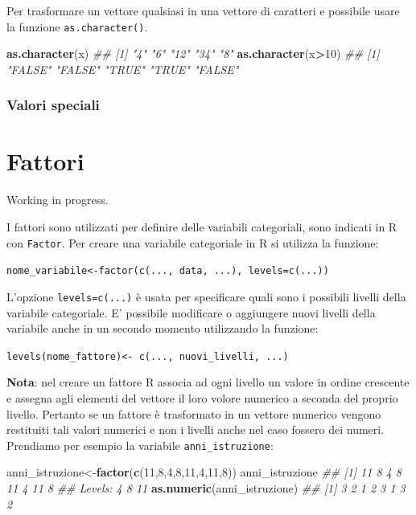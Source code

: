 \documentclass[
]{book}
\newenvironment{Shaded}{\begin{snugshade}}{\end{snugshade}}
\newcommand{\CommentTok}[1]{\textcolor[rgb]{0.56,0.35,0.01}{\textit{#1}}}
\newcommand{\DecValTok}[1]{\textcolor[rgb]{0.00,0.00,0.81}{#1}}
\newcommand{\KeywordTok}[1]{\textcolor[rgb]{0.13,0.29,0.53}{\textbf{#1}}}
\newcommand{\NormalTok}[1]{#1}
\newcommand{\OperatorTok}[1]{\textcolor[rgb]{0.81,0.36,0.00}{\textbf{#1}}}
\begin{document}
Per trasformare un vettore qualsiasi in una vettore di caratteri e possibile usare la funzione \texttt{as.character()}.

\begin{Shaded}
\begin{Highlighting}[]
\KeywordTok{as.character}\NormalTok{(x)}
\CommentTok{## [1] "4"  "6"  "12" "34" "8"}
\KeywordTok{as.character}\NormalTok{(x}\OperatorTok{>}\DecValTok{10}\NormalTok{)}
\CommentTok{## [1] "FALSE" "FALSE" "TRUE"  "TRUE"  "FALSE"}
\end{Highlighting}
\end{Shaded}

\hypertarget{valori-speciali}{%
\subsection{Valori speciali}\label{valori-speciali}}

\hypertarget{factors}{%
\chapter{Fattori}\label{factors}}

Working in progress.

I fattori sono utilizzati per definire delle variabili categoriali, sono indicati in R con \texttt{Factor}. Per creare una variabile categoriale in R si utilizza la funzione:

\texttt{nome\_variabile\textless{}-factor(c(...,\ data,\ ...),\ levels=c(...))}

L'opzione \texttt{levels=c(...)} è usata per specificare quali sono i possibili livelli della variabile categoriale. E' possibile modificare o aggiungere nuovi livelli della variabile anche in un secondo momento utilizzando la funzione:

\texttt{levels(nome\_fattore)\textless{}-\ c(...,\ nuovi\_livelli,\ ...)}

\textbf{Nota}: nel creare un fattore R associa ad ogni livello un valore in ordine crescente e assegna agli elementi del vettore il loro volore numerico a seconda del proprio livello. Pertanto se un fattore è trasformato in un vettore numerico vengono restituiti tali valori numerici e non i livelli anche nel caso fossero dei numeri. Prendiamo per esempio la variabile \texttt{anni\_istruzione}:

\begin{Shaded}
\begin{Highlighting}[]
\NormalTok{anni_istruzione<-}\KeywordTok{factor}\NormalTok{(}\KeywordTok{c}\NormalTok{(}\DecValTok{11}\NormalTok{,}\DecValTok{8}\NormalTok{,}\DecValTok{4}\NormalTok{,}\DecValTok{8}\NormalTok{,}\DecValTok{11}\NormalTok{,}\DecValTok{4}\NormalTok{,}\DecValTok{11}\NormalTok{,}\DecValTok{8}\NormalTok{))}
\NormalTok{anni_istruzione}
\CommentTok{## [1] 11 8  4  8  11 4  11 8 }
\CommentTok{## Levels: 4 8 11}
\KeywordTok{as.numeric}\NormalTok{(anni_istruzione)}
\CommentTok{## [1] 3 2 1 2 3 1 3 2}
\end{Highlighting}
\end{Shaded}
\end{document}
